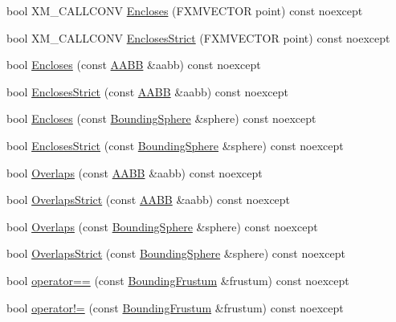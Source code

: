\begin{DoxyCompactItemize}
\item 
bool X\+M\+\_\+\+C\+A\+L\+L\+C\+O\+NV \hyperlink{classmage_1_1_bounding_frustum_adde03968d4a4f519c9b9af3b3434055f}{Encloses} (F\+X\+M\+V\+E\+C\+T\+OR point) const noexcept
\item 
bool X\+M\+\_\+\+C\+A\+L\+L\+C\+O\+NV \hyperlink{classmage_1_1_bounding_frustum_a7cd247470d192464f006b2b76ad3c336}{Encloses\+Strict} (F\+X\+M\+V\+E\+C\+T\+OR point) const noexcept
\item 
bool \hyperlink{classmage_1_1_bounding_frustum_a09642eff00ef33d0b5ea4890c9adc4b2}{Encloses} (const \hyperlink{classmage_1_1_a_a_b_b}{A\+A\+BB} \&aabb) const noexcept
\item 
bool \hyperlink{classmage_1_1_bounding_frustum_aacdbcc48558489bec9ad87d52104626d}{Encloses\+Strict} (const \hyperlink{classmage_1_1_a_a_b_b}{A\+A\+BB} \&aabb) const noexcept
\item 
bool \hyperlink{classmage_1_1_bounding_frustum_a64bb28f632ae39438424a714809c31de}{Encloses} (const \hyperlink{classmage_1_1_bounding_sphere}{Bounding\+Sphere} \&sphere) const noexcept
\item 
bool \hyperlink{classmage_1_1_bounding_frustum_ae3dce877ac0e87dd6b9f7f8644c8bcfc}{Encloses\+Strict} (const \hyperlink{classmage_1_1_bounding_sphere}{Bounding\+Sphere} \&sphere) const noexcept
\item 
bool \hyperlink{classmage_1_1_bounding_frustum_a0fbd4639f1bd0a014430313410aa013d}{Overlaps} (const \hyperlink{classmage_1_1_a_a_b_b}{A\+A\+BB} \&aabb) const noexcept
\item 
bool \hyperlink{classmage_1_1_bounding_frustum_af3a6772edd09480a22a175fa4acbfbd8}{Overlaps\+Strict} (const \hyperlink{classmage_1_1_a_a_b_b}{A\+A\+BB} \&aabb) const noexcept
\item 
bool \hyperlink{classmage_1_1_bounding_frustum_a2133c3a7187369772e82b7e229b0e683}{Overlaps} (const \hyperlink{classmage_1_1_bounding_sphere}{Bounding\+Sphere} \&sphere) const noexcept
\item 
bool \hyperlink{classmage_1_1_bounding_frustum_a070075ad4af9935b7b60e7e5345d0aff}{Overlaps\+Strict} (const \hyperlink{classmage_1_1_bounding_sphere}{Bounding\+Sphere} \&sphere) const noexcept
\item 
bool \hyperlink{classmage_1_1_bounding_frustum_a90c5a355878674b1320e195318703d4b}{operator==} (const \hyperlink{classmage_1_1_bounding_frustum}{Bounding\+Frustum} \&frustum) const noexcept
\item 
bool \hyperlink{classmage_1_1_bounding_frustum_a20c545cb807db2dc2fad018229f69c2c}{operator!=} (const \hyperlink{classmage_1_1_bounding_frustum}{Bounding\+Frustum} \&frustum) const noexcept
\end{DoxyCompactItemize}
